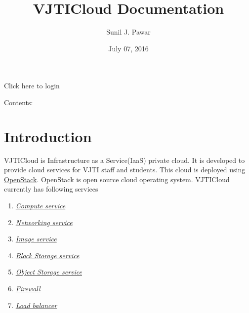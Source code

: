 \documentclass[letterpaper,10pt,english]{sphinxmanual}
\title{VJTICloud Documentation}
\date{July 07, 2016}
\author{Sunil J. Pawar}
\begin{document}
\maketitle
\tableofcontents
{}\label{index::doc}


Click here to login

Contents:


\chapter{Introduction}
\label{_source/introduction:welcome-to-vjticloud-s-documentation}\label{_source/introduction:introduction}\label{_source/introduction::doc}
VJTICloud is Infrastructure as a Service(IaaS) private cloud. It is developed to provide cloud services for VJTI staff and students. This cloud is deployed using \href{https://www.openstack.org/}{OpenStack}. OpenStack is open source cloud operating system. VJTICloud currently has following services
\begin{enumerate}
\item {} 
{\hyperref[_source/glossary:term-compute-service]{\emph{Compute service}}}

\item {} 
{\hyperref[_source/glossary:term-networking-service]{\emph{Networking service}}}

\item {} 
{\hyperref[_source/glossary:term-image-service]{\emph{Image service}}}

\item {} 
{\hyperref[_source/glossary:term-block-storage-service]{\emph{Block Storage service}}}

\item {} 
{\hyperref[_source/glossary:term-object-storage-service]{\emph{Object Storage service}}}

\item {} 
{\hyperref[_source/glossary:term-firewall]{\emph{Firewall}}}

\item {} 
{\hyperref[_source/glossary:term-load-balancer]{\emph{Load balancer}}}

\end{enumerate}
\end{document}
